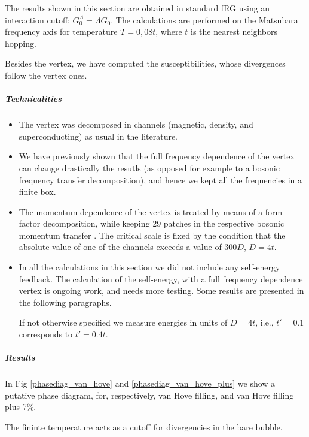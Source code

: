 The results shown in this section are obtained in standard fRG using an interaction cutoff: $G_0^\Lambda = \Lambda G_0$. The calculations are performed on the Matsubara frequency axis for temperature $T=0,08 t$, where $t$ is the nearest neighbors hopping.  

Besides the vertex, we have computed the susceptibilities, whose divergences follow the vertex ones. 

\subparagraph{Technicalities}
\begin{itemize} 

\item The vertex was decomposed in channels (magnetic, density, and superconducting) as usual in the literature. 

\item We have previously shown that the full frequency dependence of the vertex can change drastically the resutls (as opposed for example to a bosonic frequency transfer decomposition), and hence we kept all the frequencies in a finite box. 

\item The momentum dependence of the vertex is treated by means of a form factor decomposition, while keeping 29 patches in the respective bosonic momentum transfer . The critical scale is fixed by the condition that the absolute value of one of the channels exceeds a value of 300$D$, $D=4t$. 


\item In all the calculations in this section we did not include any self-energy feedback. The calculation of the self-energy, with a full frequency dependence vertex  is ongoing work, and needs more testing. Some results are presented in the following paragraphs. 
 
If not otherwise specified we measure energies in units of $D=4t$, i.e., $t'=0.1$ corresponds to $t'=0.4t$.
\end{itemize}  
\subparagraph{Results} 

In Fig \ref{phasediag_van_hove} and \ref{phasediag_van_hove_plus} we show  a putative phase diagram, for, respectively, van Hove filling, and van Hove filling plus 7\%. 

The fininte temperature acts as a cutoff for divergencies in the bare bubble. 

